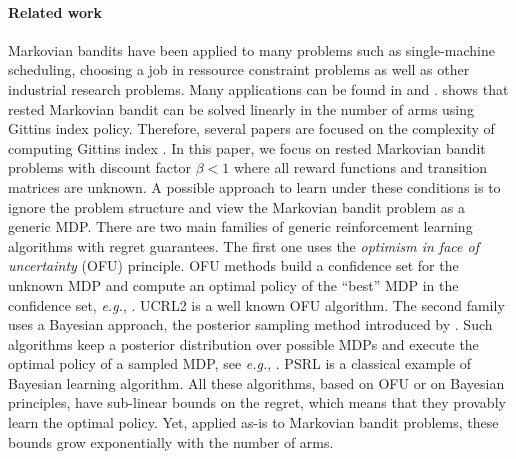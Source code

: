 \paragraph{Related work}
Markovian bandits have been applied to many problems such as single-machine scheduling, choosing a job in  ressource constraint problems  as well as other  industrial research problems. Many applications can be found in \cite[Section 3.6]{puterman2014markov} and \cite{gittins2011multi}. \cite{gittins1979bandit} shows that rested Markovian bandit can be solved linearly in the number of arms using Gittins index policy. Therefore, several papers are   focused  on the complexity of  computing  Gittins index \cite{chakravorty2014multi,gast2022computing}.
In this paper, we focus on rested Markovian bandit problems with discount factor $\beta<1$ where all
reward functions and transition matrices are
unknown. A possible approach to learn under these conditions is to ignore the problem structure and view the Markovian bandit problem as a generic MDP. There are two main families of generic reinforcement learning algorithms with regret guarantees. The first one uses the \emph{optimism in face of uncertainty} (OFU) principle.  OFU methods build a confidence set
for the unknown MDP and compute an  optimal policy of the ``best'' MDP in the
confidence set, \emph{e.g.}, \cite{bourel2020tightening,zhang2019regret,talebi2018variance,fruit2017regret,azar2017minimax,bartlett2012regal,jaksch2010near}. UCRL2 \cite{jaksch2010near} is a well known OFU algorithm.  The second family uses a Bayesian approach, the posterior sampling method introduced by \cite{thompson1933likelihood}.  Such algorithms keep a
posterior distribution over possible MDPs and execute the optimal policy of a sampled MDP, see \emph{e.g.}, \cite{ouyang2017learning,agrawal2017posterior,gopalan2015thompson,osband2013more}. PSRL \cite{osband2013more} is a classical example of Bayesian learning algorithm.  All these algorithms, based on OFU or on Bayesian principles, have sub-linear bounds on the regret, which means that they provably learn the optimal policy. Yet, applied as-is to Markovian bandit problems, these bounds grow exponentially with the number of arms.

